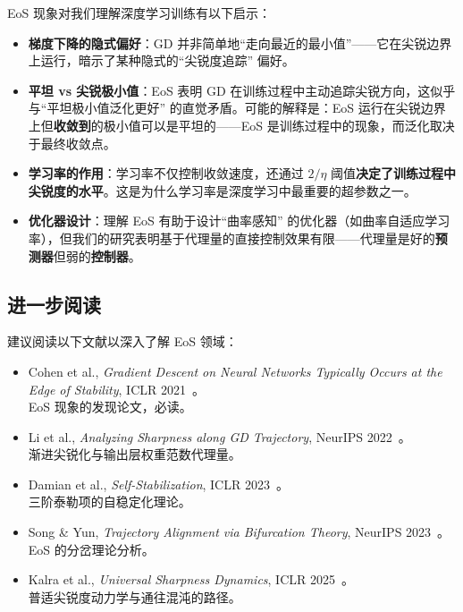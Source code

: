 \documentclass[11pt,a4paper]{ctexart}
\begin{document}
EoS 现象对我们理解深度学习训练有以下启示：

\begin{itemize}[leftmargin=2em]
  \item \textbf{梯度下降的隐式偏好}：GD 并非简单地``走向最近的最小值''——它在尖锐边界上运行，暗示了某种隐式的``尖锐度追踪'' 偏好。

  \item \textbf{平坦 vs 尖锐极小值}：EoS 表明 GD 在训练过程中主动追踪尖锐方向，这似乎与``平坦极小值泛化更好'' 的直觉矛盾。可能的解释是：EoS 运行在尖锐边界上但\textbf{收敛到}的极小值可以是平坦的——EoS 是训练过程中的现象，而泛化取决于最终收敛点。

  \item \textbf{学习率的作用}：学习率不仅控制收敛速度，还通过 $2/\eta$ 阈值\textbf{决定了训练过程中尖锐度的水平}。这是为什么学习率是深度学习中最重要的超参数之一。

  \item \textbf{优化器设计}：理解 EoS 有助于设计``曲率感知'' 的优化器（如曲率自适应学习率），但我们的研究表明基于代理量的直接控制效果有限——代理量是好的\textbf{预测器}但弱的\textbf{控制器}。
\end{itemize}

\subsection{进一步阅读}

建议阅读以下文献以深入了解 EoS 领域：

\begin{itemize}[leftmargin=2em]
  \item Cohen et al., \emph{Gradient Descent on Neural Networks Typically Occurs at the Edge of Stability}, ICLR 2021~\cite{cohen2021eos}。\\
  EoS 现象的发现论文，必读。

  \item Li et al., \emph{Analyzing Sharpness along GD Trajectory}, NeurIPS 2022~\cite{li2022sharpness}。\\
  渐进尖锐化与输出层权重范数代理量。

  \item Damian et al., \emph{Self-Stabilization}, ICLR 2023~\cite{damian2023selfstab}。\\
  三阶泰勒项的自稳定化理论。

  \item Song \& Yun, \emph{Trajectory Alignment via Bifurcation Theory}, NeurIPS 2023~\cite{song2023trajectory}。\\
  EoS 的分岔理论分析。

  \item Kalra et al., \emph{Universal Sharpness Dynamics}, ICLR 2025~\cite{kalra2025universal}。\\
  普适尖锐度动力学与通往混沌的路径。
\end{itemize}



\end{document}
